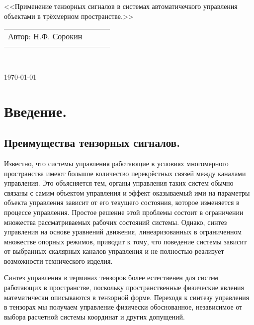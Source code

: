 \documentclass[a4paper]{article}
\begin{document}
\begin{center}
\hfill \break
\hfill\break
\hfill \break
\hfill \break
\hfill \break
\hfill \break
\hfill \break
\hfill \break
\hfill \break
\hfill \break
\large{<<Применение тензорных сигналов в системах автоматичечкого управления объектами в трёхмерном пространстве.>>}\\
\hfill \break
\hfill \break
\hfill \break
\hfill \break
\hfill \break
\hfill \break
\hfill \break
\hfill \break
\end{center}
 
\normalsize{ 
\begin{tabular}{lccl}
Автор: Н.Ф. Сорокин\\\\
\end{tabular}
}\\
\hfill \break
\hfill \break
\hfill \break
\hfill \break
\hfill \break
\begin{center} \today \end{center}
\thispagestyle{empty} %
\newpage

\section{Введение.}
\subsection{Преимущества тензорных сигналов.}

Известно, что системы управления работающие в условиях многомерного пространства имеют большое количество перекрёстных связей между каналами управления. Это объясняется тем, органы управления таких систем обычно связаны с самим объектом управления и эффект оказываемый ими на параметры объекта управления зависит от его текущего состояния, которое изменяется в процессе управления. Простое решение этой проблемы состоит в ограничении множества рассматриваемых рабочих состояний системы. Однако, синтез управления на основе уравнений движения, линеаризованных в ограниченном множестве опорных режимов, приводит к тому, что поведение системы зависит от выбранных скалярных каналов управления и не полностью реализует возможности технического изделия.

Синтез управления в терминах тензоров более естественен для систем работающих в пространстве, поскольку пространственные физические явления математически описываются в тензорной форме. Переходя к синтезу управления в тензорах мы получаем управление физически обоснованное, независимое от выбора расчетной системы координат и других допущений. 
\end{document}
